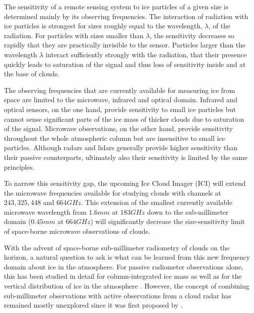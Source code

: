 \documentclass[journal abbreviation, manuscript]{copernicus}
\begin{document}
The sensitivity of a remote sensing system to ice particles of a given size is
determined mainly by its observing frequencies. The interaction of radiation
with ice particles is strongest for sizes roughly equal to the wavelength,
$\lambda$, of the radiation. For particles with sizes smaller than $\lambda$,
the sensitivity decreases so rapidly that they are practically invisible to the
sensor. Particles larger than the wavelength $\lambda$ interact sufficiently
strongly with the radiation, that their presence quickly leads to saturation of
the signal and thus loss of sensitivity inside and at the base of clouds.

The observing frequencies that are currently available for measuring ice from
space are limited to the microwave, infrared and optical domain. Infrared and
optical sensors, on the one hand, provide sensitivity to small ice particles but
cannot sense significant parts of the ice mass of thicker clouds due to
saturation of the signal. Microwave observations, on the other hand, provide
sensitivity throughout the whole atmospheric column but are insensitive to small
ice particles. Although radars and lidars generally provide higher sensitivity
than their passive counterparts, ultimately also their sensitivity is limited
by the same principles.

To narrow this sensitivity gap, the upcoming Ice Cloud Imager (ICI) will extend
the microwave frequencies available for studying clouds with channels at $243,
325, 448$ and $664\unit{GHz}$. This extension of the smallest currently available
microwave wavelength from $1.6\unit{mm}$ at $183\unit{GHz}$ down to the
sub-millimeter domain ($0.45\unit{mm}$ at $664\unit{GHz}$) will significantly
decrease the size-sensitivity limit of space-borne microwave observations of
clouds.

With the advent of space-borne sub-millimeter radiometry of clouds on the
horizon, a natural question to ask is what can be learned from this new
frequency domain about  ice in the atmosphere. For passive
radiometer observations alone, this has been studied in detail for
column-integrated ice mass \citep{jimenez07, wang16, brath18a} as well as for
the vertical distribution of ice in the atmosphere \citep{wang16, grutzun18}.
However, the concept of combining sub-millimeter observations with active
observations from a cloud radar has remained mostly unexplored since it was
first proposed by \cite{evans05}.
\end{document}

